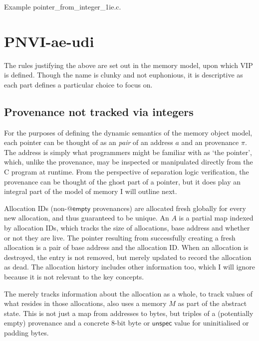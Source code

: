 \begin{marginfigure}
    \centering
    \caption{Example pointer\_from\_integer\_1ie.c.}\label{fig:mem-model-ptr-from-int}
\end{marginfigure}

\clearpage%
\section{PNVI-ae-udi}

The rules justifying the above are set out in the  memory model,
upon which VIP is defined. Though the name is clunky and not euphonious, it is
descriptive as each part defines a particular choice to focus on.

\subsection{Provenance not tracked via integers}

For the purposes of defining the dynamic semantics of the memory object model,
each pointer can be thought of as an \emph{pair} of an address $a$ and an
provenance $\pi$. The address is simply what programmers might be familiar
with as `the pointer', which, unlike the provenance, may be inspected or
manipulated directly from the C program at runtime. From the perspective of
separation logic verification, the provenance can be thought of the ghost
part of a pointer, but it does play an integral part of the model of memory I
will outline next.

Allocation IDs (non-$@\mathsf{empty}$ provenances) are allocated fresh
globally for every new
allocation, and thus guaranteed to be unique. An 
$\mathit{A}$ is a partial map indexed by allocation IDs, which tracks the size
of allocations, base address and whether or not they are live. The pointer
resulting from successfully creating a fresh allocation is a pair of base
address and the allocation ID\@. When an allocation is destroyed, the entry is
not removed, but merely updated to record the allocation as dead. The
allocation history includes other information too, which I will ignore because
it is not relevant to the key concepts.

The  merely tracks information about the allocation as a
whole, to track values of what resides in those allocations, 
also uses a memory $M$ as part of the abstract state. This is not just a map
from addresses to bytes, but triples of a (potentially empty) provenance and a
concrete 8-bit byte or $\mathsf{unspec}$ value for uninitialised or padding
bytes.\label{sn:ignore-ptr-index}

